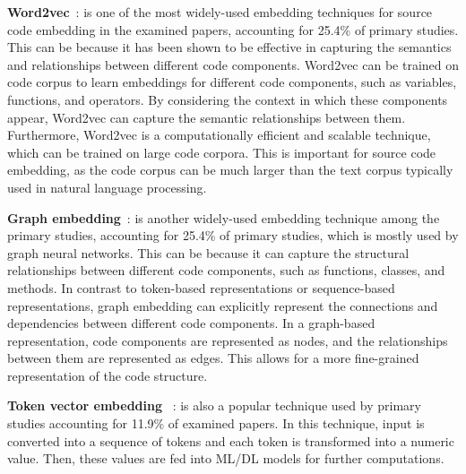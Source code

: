 

\noindent \textbf{Word2vec}~\cite{chen2020machine, sabetta2018practical, zhou2017automated, jeon2021autovas, yamaguchi2013chucky, du2020cross, lin2018cross, liu2019deepbalance, pradel2018deepbugs, zhou2019devign, yan2021han, 3360588, 3429444, 8594942, zou2019mu, scandariato2014predicting, riom2021revisiting, lin2019software, perl2015vccfinder, li2021vulnerability}: is one of the most widely-used embedding techniques for source code embedding in the examined papers, accounting for 25.4\% of primary studies. This can be because it has been shown to be effective in capturing the semantics and relationships between different code components. Word2vec can be trained on code corpus to learn embeddings for different code components, such as variables, functions, and operators. By considering the context in which these components appear, Word2vec can capture the semantic relationships between them. Furthermore, Word2vec is a computationally efficient and scalable technique, which can be trained on large code corpora. This is important for source code embedding, as the code corpus can be much larger than the text corpus typically used in natural language processing.

\noindent \textbf{Graph embedding}~\cite{liu2021combining, wang2020combining, phan2017convolutional, zeng2021gcn2defect, dinella2020hoppity, cao2022mvd, ghaffarian2021neural, wu2021peculiar, zhuang2020smart, duan2019vulsniper, zheng2021vulspg}: is another widely-used embedding technique among the primary studies, accounting for 25.4\% of primary studies, which is mostly used by graph neural networks. 
This can be because it can capture the structural relationships between different code components, such as functions, classes, and methods. In contrast to token-based representations or sequence-based representations, graph embedding can explicitly represent the connections and dependencies between different code components. In a graph-based representation, code components are represented as nodes, and the relationships between them are represented as edges. This allows for a more fine-grained representation of the code structure. 

\noindent \textbf{Token vector embedding}~ \cite{dam2018automatic, dam2017automatic, liu2020cd, wang2016automatically, hoang2019deepjit, mao2020explainable, yamaguchi2012generalized, hin2022linevd, fu2022linevul, chen2021neural, lin2017poster, yamaguchi2011vulnerability}: is also a popular technique used by primary studies accounting for 11.9\% of examined papers. In this technique, input is converted into a sequence of tokens and each token is transformed into a numeric value. Then, these values are fed into ML/DL models for further computations. 

